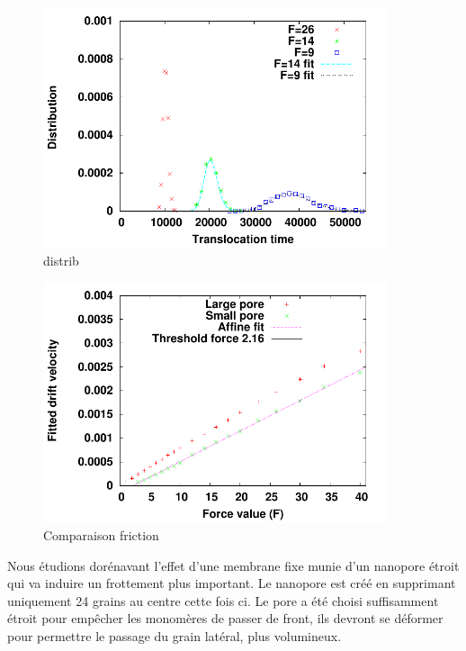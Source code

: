 \begin{figure}[H]
\begin{center}
\includegraphics[width=0.9\textwidth]{distribsmallpore.pdf} 
\caption[Distribution des temps de translocation du polymère structuré avec un pore étroit]{distrib}
\label{smallporedistrib}
\end{center}
\end{figure}




\begin{figure}[H]
\begin{center}
\includegraphics[width=0.9\textwidth]{structuredporesfirction.pdf} 
\caption[Différence de friction entre les pores]{Comparaison friction}
\label{compporesizefriction}
\end{center}
\end{figure}




Nous étudions dorénavant l'effet d'une membrane fixe munie d'un nanopore étroit qui va induire un frottement plus important. Le nanopore est créé en supprimant uniquement 24 grains au centre cette fois ci. Le pore a été choisi suffisamment étroit pour empêcher les monomères de passer de front, ils devront se déformer pour permettre le passage du grain latéral, plus volumineux.\\

